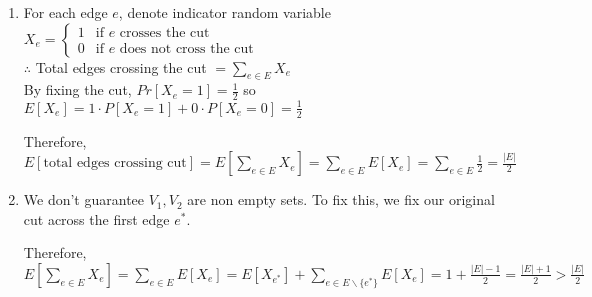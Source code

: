 \documentclass[12pt, a4paper]{article}
\begin{document}
\begin{enumerate}[Q\arabic*).]
  \item For each edge $e$, denote indicator random variable $X_e = \begin{cases}1&\text{if $e$ crosses the cut}\\ 0&\text{if $e$ does not cross the cut}\end{cases}$\\
    $\therefore$ Total edges crossing the cut $= \displaystyle\sum_{e\in E}X_e$\\
    By fixing the cut, $Pr[X_e = 1] = \frac{1}{2}$ so $E[X_e] = 1 \cdot P[X_e = 1] + 0\cdot P[X_e = 0] = \frac{1}{2}$

    Therefore, $\displaystyle E[\text{total edges crossing cut}] = E[\sum_{e\in E}X_e] = \sum_{e\in E} E[X_e] = \sum_{e\in E}\frac{1}{2} = \frac{|E|}{2}$

  \item We don't guarantee $V_1, V_2$ are non empty sets. To fix this, we fix our original cut across the first edge $e^*$.

    Therefore, $\displaystyle E[\sum_{e\in E}X_e] = \sum_{e\in E}E[X_e] = E[X_{e^*}] + \sum_{e\in E \backslash\{e^*\}} E[X_e] = 1 + \frac{|E| - 1}{2} = \frac{|E| + 1}{2} > \frac{|E|}{2}$
\end{enumerate}
\end{document}
